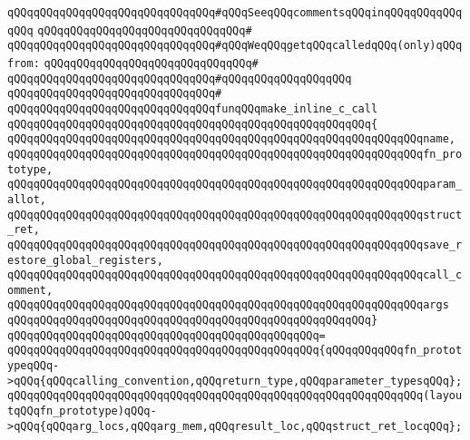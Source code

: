 \newline
\verb|qQQqqQQqqQQqqQQqqQQqqQQqqQQqqQQq#qQQqSeeqQQqcommentsqQQqinqQQqqQQqqQQqqQQq|\newline
\verb|qQQqqQQqqQQqqQQqqQQqqQQqqQQqqQQq#|\newline
\verb|qQQqqQQqqQQqqQQqqQQqqQQqqQQqqQQq#qQQqWeqQQqgetqQQqcalledqQQq(only)qQQqfrom:|\newline
\verb|qQQqqQQqqQQqqQQqqQQqqQQqqQQqqQQq#|\newline
\verb|qQQqqQQqqQQqqQQqqQQqqQQqqQQqqQQq#qQQqqQQqqQQqqQQqqQQq|\newline
\verb|qQQqqQQqqQQqqQQqqQQqqQQqqQQqqQQq#|\newline
\verb|qQQqqQQqqQQqqQQqqQQqqQQqqQQqqQQqfunqQQqmake_inline_c_call|\newline
\verb|qQQqqQQqqQQqqQQqqQQqqQQqqQQqqQQqqQQqqQQqqQQqqQQqqQQqqQQq{|\newline
\verb|qQQqqQQqqQQqqQQqqQQqqQQqqQQqqQQqqQQqqQQqqQQqqQQqqQQqqQQqqQQqqQQqname,|\newline
\verb|qQQqqQQqqQQqqQQqqQQqqQQqqQQqqQQqqQQqqQQqqQQqqQQqqQQqqQQqqQQqqQQqfn_prototype,|\newline
\verb|qQQqqQQqqQQqqQQqqQQqqQQqqQQqqQQqqQQqqQQqqQQqqQQqqQQqqQQqqQQqqQQqparam_allot,|\newline
\verb|qQQqqQQqqQQqqQQqqQQqqQQqqQQqqQQqqQQqqQQqqQQqqQQqqQQqqQQqqQQqqQQqstruct_ret,|\newline
\verb|qQQqqQQqqQQqqQQqqQQqqQQqqQQqqQQqqQQqqQQqqQQqqQQqqQQqqQQqqQQqqQQqsave_restore_global_registers,|\newline
\verb|qQQqqQQqqQQqqQQqqQQqqQQqqQQqqQQqqQQqqQQqqQQqqQQqqQQqqQQqqQQqqQQqcall_comment,|\newline
\verb|qQQqqQQqqQQqqQQqqQQqqQQqqQQqqQQqqQQqqQQqqQQqqQQqqQQqqQQqqQQqqQQqargs|\newline
\verb|qQQqqQQqqQQqqQQqqQQqqQQqqQQqqQQqqQQqqQQqqQQqqQQqqQQqqQQq}|\newline
\verb|qQQqqQQqqQQqqQQqqQQqqQQqqQQqqQQqqQQqqQQqqQQqqQQq=|\newline
\verb|qQQqqQQqqQQqqQQqqQQqqQQqqQQqqQQqqQQqqQQqqQQqqQQq{qQQqqQQqqQQqfn_prototypeqQQq->qQQq{qQQqcalling_convention,qQQqreturn_type,qQQqparameter_typesqQQq};|\newline
\newline
\verb|qQQqqQQqqQQqqQQqqQQqqQQqqQQqqQQqqQQqqQQqqQQqqQQqqQQqqQQqqQQqqQQq(layoutqQQqfn_prototype)qQQq->qQQq{qQQqarg_locs,qQQqarg_mem,qQQqresult_loc,qQQqstruct_ret_locqQQq};|\newline
